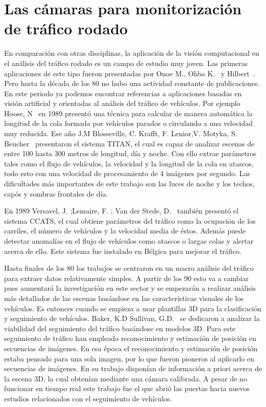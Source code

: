 \section{Las cámaras para monitorización de tráfico rodado}

En comparación con otras disciplinas, la aplicación de la visión computacional en el análisis del tráfico rodado es un campo de estudio muy joven. Las primeras aplicaciones de este tipo fueron presentadas por Onoe  M.,  Ohba  K.~\cite{digital_analisis} y Hilbert~\cite{wide_area}. Pero hasta la década de los 80 no hubo una actividad constante de publicaciones. En este periodo ya podemos encontrar referencias a aplicaciones basadas en visión artificial y orientadas al análisis del tráfico de vehículos. Por ejemplo Hoose, N~\cite{queue_detection} en 1989 presentó una técnica para calcular de manera automática la longitud de la cola formada por vehículos parados o circulando a una velocidad muy reducida. Ese año J.M Blosseville, C. Krafft, F. Lenior,V. Motyka, S. Beucher~\cite{traffic_measurement} presentaron el sistema TITAN, el cual es capaz de analizar escenas de entre 100 hasta 300 metros de longitud, día y noche. Con ello extrae parámetros tales como el flujo de vehículos, la velocidad y la longitud de la cola en atascos, todo esto con una velocidad de procesamiento de 4 imágenes por segundo. Las dificultades más importantes de este trabajo son las luces de noche y los techos, capós y sombras frontales de día. 

En 1989 Versavel, J. ;Lemaire, F. ; Van der Stede, D.~\cite{computer_aided} también presentó el sistema CCATS, el cual obtiene parámetros del tráfico como la ocupación de los carriles, el número de vehículos y la velocidad media de éstos. Además puede detectar anomalías en el flujo de vehículos como atascos o largas colas y alertar acerca de ello. Este sistema fue instalado en Bélgica para mejorar el tráfico.

Hasta finales de los 80 los trabajos se centraron en un macro análisis del tráfico para extraer datos relativamente simples. A partir de los 90 esto va a cambiar pues aumentará la investigación en este sector y se empezarán a realizar análisis más detallados de las escenas basándose en las características visuales de los vehículos. Es entonces cuando se empieza a usar plantillas 3D para la clasificación y seguimiento de vehículos. Baker, K.D Sullivan, G.D.~\cite{performance_assessment} se dedicaron a analizar la viabilidad del seguimiento del tráfico basándose en modelos 3D. Para este seguimiento de tráfico han empleado reconocimiento y estimación de posición en secuencias de imágenes. En esa época el reconocimiento y estimación de posición estaba pensado para una sola imagen, por lo que fueron pioneros al aplicarlo en secuencias de imágenes. En su trabajo disponían de información a priori acerca de la escena 3D, la cual obtenían mediante una cámara calibrada. A pesar de no funcionar en tiempo real este trabajo fue el que abrió las puertas hacia nuevos estudios relacionados con el seguimiento de vehículos.

